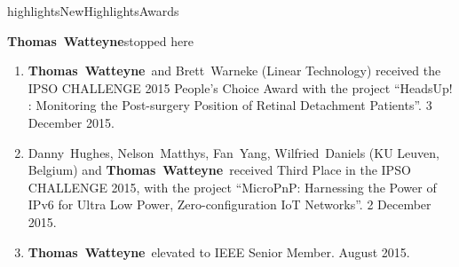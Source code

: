 \documentclass{ra2016}
\newcommand{\thomas}           {\textbf{Thomas~Watteyne}}
\begin{document}

\begin{module}{highlights}{NewHighlights}{Awards}


\thomas{stopped here}

\begin{enumerate}
    \item \thomas~and Brett~Warneke (Linear Technology) received the IPSO CHALLENGE 2015 People's Choice Award  with the project ``HeadsUp! : Monitoring the Post-surgery Position of Retinal Detachment Patients''. 3 December 2015.
    \item Danny~Hughes, Nelson~Matthys, Fan~Yang, Wilfried~Daniels (KU Leuven, Belgium) and \thomas~received Third Place in the IPSO CHALLENGE 2015, with the project ``MicroPnP: Harnessing the Power of IPv6 for Ultra Low Power, Zero-configuration IoT Networks''. 2 December 2015.
    \item \thomas~elevated to IEEE Senior Member. August 2015.
\end{enumerate}

\end{module}

\end{document}
